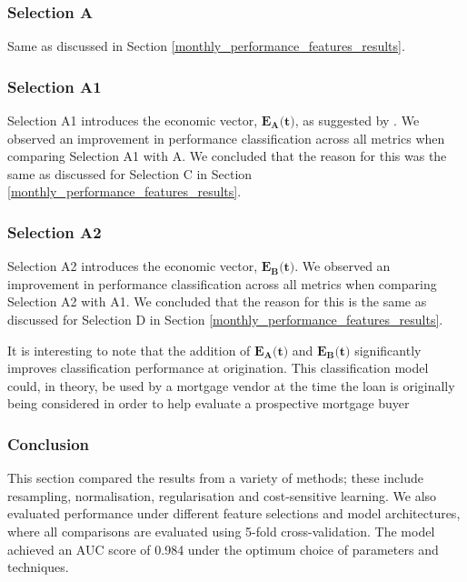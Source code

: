             \subsubsection{Selection A}
            Same as discussed in Section \ref{monthly_performance_features_results}.
            
            \subsubsection{Selection A1}
            Selection A1 introduces the economic vector, $\textbf{$\textbf{$\mathbf{E_{A}}$}$(t)}$, as suggested by \cite{mortgage_risk}. We observed an improvement in performance classification across all metrics when comparing Selection A1 with A. We concluded that the reason for this was the same as discussed for Selection C in Section \ref{monthly_performance_features_results}. 
            
            \subsubsection{Selection A2}
            Selection A2 introduces the economic vector, $\textbf{$\textbf{$\mathbf{E_{B}}$}$(t)}$. We observed an improvement in performance classification across all metrics when comparing Selection A2 with A1. We concluded that the reason for this is the same as discussed for Selection D in Section \ref{monthly_performance_features_results}. 
            
            It is interesting to note that the addition of $\textbf{$\textbf{$\mathbf{E_{A}}$}$(t)}$ and $\textbf{$\textbf{$\mathbf{E_{B}}$}$(t)}$ significantly improves classification performance at origination. This classification model could, in theory, be used by a mortgage vendor at the time the loan is originally being considered in order to help evaluate a prospective mortgage buyer
            
            
    
    
            

    
    \subsubsection{Conclusion}
        This section compared the results from a variety of methods; these include resampling, normalisation, regularisation and cost-sensitive learning. We also evaluated performance under different feature selections and model architectures, where all comparisons are evaluated using 5-fold cross-validation. The model achieved an AUC score of 0.984 under the optimum choice of parameters and techniques.


\clearpage

    
    